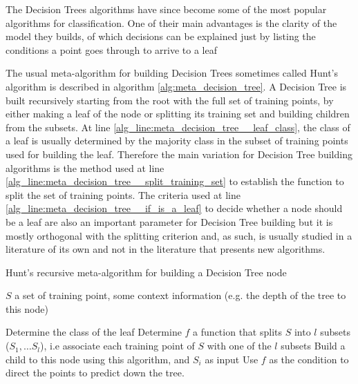 The Decision Trees algorithms have since become some of the most popular algorithms for classification. One of their main advantages is the clarity of the model they builds, of which decisions can be explained just by listing the conditions a point goes through to arrive to a leaf

The usual meta-algorithm for building Decision Trees sometimes called Hunt's algorithm \cite{Priyanka2020_decision_trees_survey} is described in algorithm \ref{alg:meta_decision_tree}. A Decision Tree is built recursively starting from the root with the full set of training points, by either making a leaf of the node or splitting its training set and building children from the subsets.
At line \ref{alg_line:meta_decision_tree__leaf_class}, the class of a leaf is usually determined by the majority class in the subset of training points used for building the leaf. Therefore the main variation for Decision Tree building algorithms is the method used at line \ref{alg_line:meta_decision_tree__split_training_set} to establish the function to split the set of training points. The criteria used at line \ref{alg_line:meta_decision_tree__if_is_a_leaf} to decide whether a node should be a leaf are also an important parameter for Decision Tree building but it is mostly orthogonal with the splitting criterion and, as such, is usually studied in a literature of its own and not in the literature that presents new algorithms.

\begin{algorithm}
\caption{Hunt's recursive meta-algorithm for building a Decision Tree node}
\label{alg:meta_decision_tree}
\begin{algorithmic}[1]
    \Require $S$ a set of training point, some context information (e.g. the depth of the tree to this node)
    
        \State Determine the class of the leaf \label{alg_line:meta_decision_tree__leaf_class}
    \Else
        \State Determine $f$ a function that splits $S$ into $l$ subsets ($S_1, \dots S_l$), i.e associate each training point of $S$ with one of the $l$ subsets\label{alg_line:meta_decision_tree__split_training_set}
            \State Build a child to this node using this algorithm, and $S_i$ as input\label{alg_line:meta_decision_tree__build_children}
        \EndFor
        \State Use $f$ as the condition to direct the points to predict  down the tree.
    \EndIf
\end{algorithmic}
\end{algorithm}

